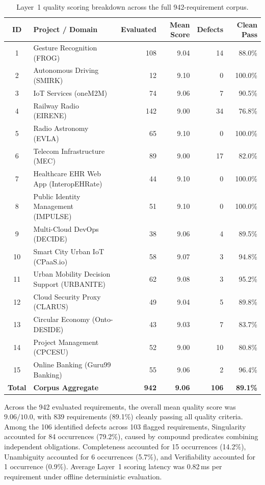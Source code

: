 \documentclass[journal]{IEEEtran}
\begin{document}
\begin{table}[htbp]
\centering
\caption{Layer~1 quality scoring breakdown across the full 942-requirement corpus.}
\label{tab:layer1-breakdown}
\small
\setlength{\tabcolsep}{3pt}
\begin{tabularx}{\columnwidth}{@{}c>{\raggedright\arraybackslash}Xrrrr@{}}
\toprule
\textbf{ID} & \textbf{Project / Domain} & \textbf{Evaluated} & \textbf{Mean Score} & \textbf{Defects} & \textbf{Clean Pass} \\
\midrule
1  & Gesture Recognition (FROG)           & 108 & 9.04 & 14 & 88.0\% \\
2  & Autonomous Driving (SMIRK)           & 12  & 9.10 & 0  & 100.0\% \\
3  & IoT Services (oneM2M)                & 74  & 9.06 & 7  & 90.5\% \\
4  & Railway Radio (EIRENE)               & 142 & 9.00 & 34 & 76.8\% \\
5  & Radio Astronomy (EVLA)               & 65  & 9.10 & 0  & 100.0\% \\
6  & Telecom Infrastructure (MEC)         & 89  & 9.00 & 17 & 82.0\% \\
7  & Healthcare EHR Web App (InteropEHRate) & 44  & 9.10 & 0  & 100.0\% \\
8  & Public Identity Management (IMPULSE) & 51  & 9.10 & 0  & 100.0\% \\
9  & Multi-Cloud DevOps (DECIDE)          & 38  & 9.06 & 4  & 89.5\% \\
10 & Smart City Urban IoT (CPaaS.io)      & 58  & 9.07 & 3  & 94.8\% \\
11 & Urban Mobility Decision Support (URBANITE) & 62  & 9.08 & 3  & 95.2\% \\
12 & Cloud Security Proxy (CLARUS)        & 49  & 9.04 & 5  & 89.8\% \\
13 & Circular Economy (Onto-DESIDE)       & 43  & 9.03 & 7  & 83.7\% \\
14 & Project Management (CPCESU)          & 52  & 9.00 & 10 & 80.8\% \\
15 & Online Banking (Guru99 Banking)      & 55  & 9.06 & 2  & 96.4\% \\
\midrule
\textbf{Total} & \textbf{Corpus Aggregate} & \textbf{942} & \textbf{9.06} & \textbf{106} & \textbf{89.1\%} \\
\bottomrule
\end{tabularx}
\end{table}

Across the 942 evaluated requirements, the overall mean quality score was $9.06/10.0$, with 839 requirements (89.1\%) cleanly passing all quality criteria. Among the 106 identified defects across 103 flagged requirements, Singularity accounted for 84 occurrences (79.2\%), caused by compound predicates combining independent obligations. Completeness accounted for 15 occurrences (14.2\%), Unambiguity accounted for 6 occurrences (5.7\%), and Verifiability accounted for 1 occurrence (0.9\%). Average Layer~1 scoring latency was 0.82\,ms per requirement under offline deterministic evaluation.
\end{document}

